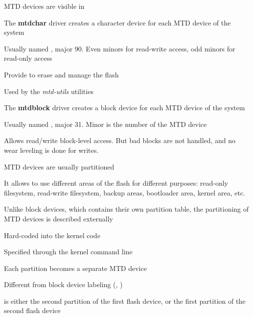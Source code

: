 

  \startitemize
  \item MTD devices are visible in 
  \item The {\bf mtdchar} driver creates a character device for each
    MTD device of the system
    \startitemize
    \item Usually named , major 90. Even minors for
      read-write access, odd minors for read-only access
    \item Provide  to erase and manage the flash
    \item Used by the {\em mtd-utils} utilities
    \stopitemize
  \item The {\bf mtdblock} driver creates a block device for each MTD
    device of the system
    \startitemize
    \item Usually named , major 31. Minor is the
      number of the MTD device
    \item Allows read/write block-level access. But bad blocks are not
      handled, and no wear leveling is done for writes.
    \stopitemize
  \stopitemize

  \startitemize
  \item MTD devices are usually partitioned
    \startitemize
    \item It allows to use different areas of the flash for different
      purposes: read-only filesystem, read-write filesystem, backup
      areas, bootloader area, kernel area, etc.
    \stopitemize
  \item Unlike block devices, which contains their own partition
    table, the partitioning of MTD devices is described externally
    \startitemize
    \item Hard-coded into the kernel code
    \item Specified through the kernel command line
    \stopitemize
  \item Each partition becomes a separate MTD device
    \startitemize
    \item Different from block device labeling (,
      )
    \item {} is either the second partition of the first
      flash device, or the first partition of the second flash device
\stopitemize
\stopitemize


